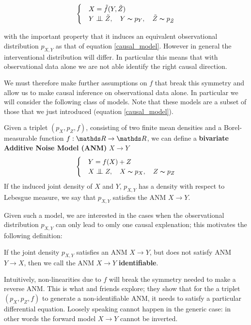 \begin{equation}
    \begin{cases} 
        & X = \tilde{f}(Y, \tilde{Z}) \\
        & Y \bigCI \tilde{Z},\quad Y \thicksim p_Y,\quad \tilde{Z} \thicksim p_{\tilde{Z}}  
     \end{cases}
\end{equation}

with the important property that it induces an equivalent observational distribution $p_{X, Y}$ as that of 
equation \ref{causal_model}. However in general the interventional distribution will differ. In particular 
this means that with observational data alone we are not able identify the right causal direction.

We must therefore make further assumptions on $f$ that break this symmetry and allow us to make causal inference
on observational data alone.
In particular we will consider the following class of models. Note that these models are a subset of those 
that we just introduced (equation \ref{causal_model}).

\begin{definition} Given a triplet $(p_X, p_Z, f)$, consisting of two finite mean densities and a Borel-measurable function
$f: \R \rightarrow \R$, we can define a \textbf{bivariate Additive Noise Model (ANM)} $X \rightarrow Y$
\[
    \begin{cases} 
        & Y = f(X) + Z \\
        & X \bigCI Z,\quad X \thicksim p_X,\quad Z \thicksim p_{Z}  
     \end{cases}  
\]
If the induced joint density of $X$ and $Y$, $p_{X, Y}$ has a density with respect to Lebesgue measure, 
we say that $p_{X, Y}$ satisfies the ANM $X \rightarrow Y$.
\end{definition}

Given such a model, we are interested in the cases when the observational distribution $p_{X, Y}$ can only
lead to omly one causal explenation; this motivates the following definition:

\begin{definition} If the joint density $p_{X, Y}$ satisfies an ANM $X \rightarrow Y$, but does not satisfy
ANM $Y \rightarrow X$, then we call the ANM $X \rightarrow Y$ \textbf{identifiable}. 
\end{definition}

Intuitively, non-linearities due to $f$ will break the symmetry needed to make a reverse ANM. This is what
\cite{hoyer2009nonlinear} and friends explore; they show that for the 
a triplet $(p_X, p_Z, f)$ to generate a non-identifiable ANM, it needs to satisfy a particular 
differential equation. Loosely speaking cannot happen in the generic case: in other words the forward 
model $X \rightarrow Y$ cannot be inverted. 

